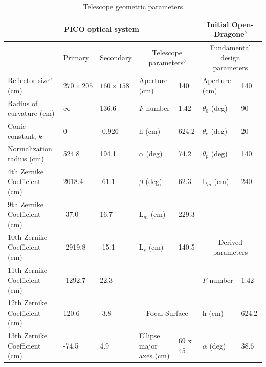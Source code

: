 \documentclass[]{spie}  %
\begin{document}
\begin{table}[ht]
\centering
\caption{Telescope geometric parameters  \label{tab:optics}}

\begin{adjustbox}{width=1.05\textwidth}
\hspace{-1cm}
\begin{tabular}{|l|llll||ll|}
\hline
\multicolumn{5}{|c||}{PICO optical system}                                    & \multicolumn{2}{c|}{Initial Open-Dragone$^b$}     \\ \hline
                          & Primary           & Secondary    & \multicolumn{2}{c||}{Telescope parameters$^b$} & \multicolumn{2}{c|}{Fundamental design parameters}  \\
Reflector size$^a$ (cm)      & $270 \times 205$ & $160 \times 158$ & Aperture (cm)           & 140      & Aperture (cm)                  & 140   \\
Radius of curvature (cm)  & $\infty$         & 136.6             & $F$-number             & 1.42     & $\theta_0$ (deg)           & 90    \\
Conic constant, $k$       & 0                 & -0.926            & h (cm)                    & 624.2    & $\theta_e$ (deg)           & 20    \\
Normalization radius (cm) & 524.8             & 194.1             & $\alpha$ (deg)            & 74.2     & $\theta_p$ (deg)           & 140   \\
4th Zernike Coefficient (cm)  & 2018.4            & -61.1             & $\beta$  (deg)            &  62.3    & L$_m$ (cm)                     & 240   \\
9th Zernike Coefficient (cm)  & -37.0             & 16.7              & L$_m$ (cm)                &   229.3  &                                &         \\
10th Zernike Coefficient (cm) & -2919.8           & -15.1             & L$_s$ (cm)                &   140.5  & \multicolumn{2}{c|}{Derived parameters} \\ 
11th Zernike Coefficient (cm) & -1292.7           & 22.3              &                           &          & $F$-number                     & 1.42  \\   
12th Zernike Coefficient (cm) & 120.6             & -3.8             &   \multicolumn{2}{c||}{Focal Surface}  & h (cm)                         & 624.2 \\   
13th Zernike Coefficient (cm) & -74.5             & 4.9               & Ellipse major axes (cm)   & 69 x 45  & $\alpha$ (deg)                 & 38.6  \\   

\end{tabular}
\end{adjustbox}
\end{table}
\end{document}
